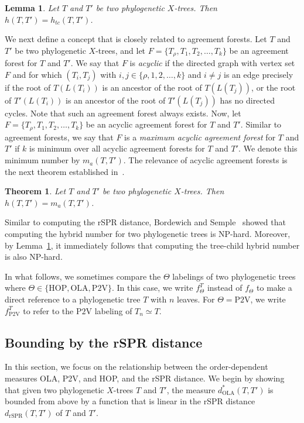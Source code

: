 \documentclass{article}
\newtheorem{lemma}{Lemma}
\newtheorem{theorem}{Theorem}
\newcommand{\rSPR}{\mathrm{rSPR}}
\newcommand{\HOP}{\mathrm{HOP}}
\newcommand{\OLA}{\mathrm{OLA}}
\newcommand{\PV}{\mathrm{P2V}}
\begin{document}
\begin{lemma}\label{l:tc-hybrid}
Let $T$ and $T'$ be two phylogenetic $X$-trees. Then $h(T,T')=h_{tc}(T,T')$.
\end{lemma}

We next define a concept that is closely related to agreement forests. Let $T$ and $T'$ be two phylogenetic $X$-trees, and let $F=\{T_\rho,T_1,T_2,\ldots,T_k\}$ be an agreement forest for $T$ and $T'$. We say that $F$ is {\em acyclic} if the directed graph with vertex set $F$ and for which $(T_i,T_j)$ with $i,j\in\{\rho,1,2,\ldots,k\}$ and $i\ne j$ is an edge precisely if the root of $T(L(T_i))$ is an ancestor of the root of $T(L(T_j))$, or the root of $T'(L(T_i))$ is an ancestor of the root of $T'(L(T_j))$ has no directed cycles. Note that such an agreement forest always exists. Now, let $F=\{T_\rho,T_1,T_2,\ldots,T_k\}$ be an acyclic agreement forest for $T$ and $T'$. Similar to agreement forests, we say that $F$ is a {\em maximum acyclic agreement forest} for $T$ and $T'$ if $k$ is minimum over all acyclic agreement forests for $T$ and $T'$. We denote this minimum number by $m_a(T,T')$. The relevance of acyclic agreement forests is the next theorem established in~\cite[Theorem 2]{baroni2005bounding}.

\begin{theorem} \label{thm:hybridnumber}
Let $T$ and $T'$ be two  phylogenetic $X$-trees. Then $h(T,T')=m_a(T,T')$.
\end{theorem}

\noindent Similar to computing the rSPR distance, Bordewich and Semple~\cite{bordewich2007computing} showed that computing the hybrid number for 
two phylogenetic trees is NP-hard. Moreover, by Lemma~\ref{l:tc-hybrid}, it immediately follows that computing the tree-child hybrid number is also NP-hard.

 In what follows, we sometimes compare the $\Theta$ labelings of two phylogenetic trees where  $\Theta\in\{\HOP,\OLA,\PV\}$.  In this case, we write $f_\Theta ^T$ instead of $f_\Theta$ to make a direct reference to a phylogenetic tree $T$ with $n$ leaves. For $\Theta=\PV$, we write $f_\PV^T$ to refer to the $\PV$ labeling of $T_n\simeq T$.


\subsection{Bounding by the rSPR distance}
\label{results:rspr}
In this section, we focus on the relationship between the order-dependent measures OLA, P2V, and HOP, and the rSPR distance. 
We begin by showing that given two phylogenetic $X$-trees $T$ and $T'$, the measure $d^\ast_\OLA(T,T')$ is bounded from above by a function that is linear in the rSPR distance $d_\rSPR(T,T')$ of $T$ and $T'$. 
\end{document}
